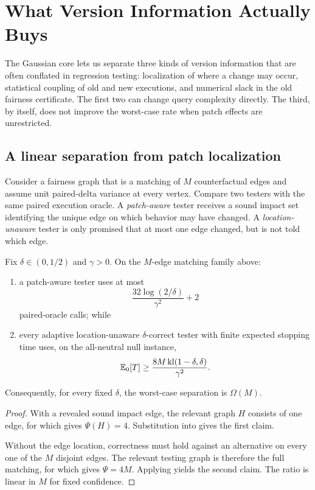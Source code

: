\section{What Version Information Actually Buys}
\label{sec:consequences}

The Gaussian core lets us separate three kinds of version information that are
often conflated in regression testing: localization of where a change may occur,
statistical coupling of old and new executions, and numerical slack in the old
fairness certificate.  The first two can change query complexity directly.  The
third, by itself, does not improve the worst-case rate when patch effects are
unrestricted.

\subsection{A linear separation from patch localization}

Consider a fairness graph that is a matching of $M$ counterfactual edges and
assume unit paired-delta variance at every vertex.  Compare two testers with the
same paired execution oracle.  A \emph{patch-aware} tester receives a sound
impact set identifying the unique edge on which behavior may have changed.  A
\emph{location-unaware} tester is only promised that at most one edge changed,
but is not told which edge.

\begin{corollary}
\label{cor:locality-separation}
Fix $\delta\in(0,1/2)$ and $\gamma>0$.  On the $M$-edge matching family above:
\begin{enumerate}[label=(\roman*)]
\item a patch-aware tester uses at most
\[
\frac{32\log(2/\delta)}{\gamma^2}+2
\]
paired-oracle calls; while
\item every adaptive location-unaware $\delta$-correct tester with finite expected
stopping time uses, on the all-neutral null instance,
\[
\mathbb{E}_0[T]\ge
\frac{8M\,\mathrm{kl}(1-\delta,\delta)}{\gamma^2}.
\]
\end{enumerate}
Consequently, for every fixed $\delta$, the worst-case separation is
$\Omega(M)$.
\end{corollary}

\begin{proof}
With a revealed sound impact edge, the relevant graph $H$ consists of one edge,
for which  gives $\Psi(H)=4$.  Substitution into
 gives the first claim.

Without the edge location, correctness must hold against an alternative on every
one of the $M$ disjoint edges.  The relevant testing graph is therefore the full
matching, for which  gives $\Psi=4M$.  Applying
 yields the second claim.  The ratio is linear in $M$ for fixed
confidence.
\end{proof}

